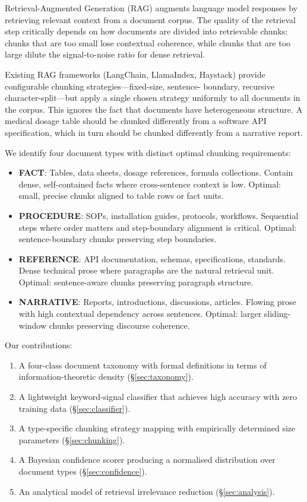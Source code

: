 \documentclass[conference]{IEEEtran}
\begin{document}
Retrieval-Augmented Generation (RAG)
\cite{lewis2020rag,karpukhin2020dpr} augments language model
responses by retrieving relevant context from a document
corpus. The quality of the retrieval step critically depends
on how documents are divided into retrievable chunks: chunks
that are too small lose contextual coherence, while chunks
that are too large dilute the signal-to-noise ratio for
dense retrieval.

Existing RAG frameworks (LangChain, LlamaIndex, Haystack)
provide configurable chunking strategies—fixed-size, sentence-
boundary, recursive character-split—but apply a single
chosen strategy uniformly to all documents in the corpus.
This ignores the fact that documents have heterogeneous
structure. A medical dosage table should be chunked
differently from a software API specification, which in
turn should be chunked differently from a narrative report.

We identify four document types with distinct optimal
chunking requirements:

\begin{itemize}
  \item \textbf{FACT}: Tables, data sheets, dosage
    references, formula collections. Contain dense,
    self-contained facts where cross-sentence context
    is low. Optimal: small, precise chunks aligned to
    table rows or fact units.
  \item \textbf{PROCEDURE}: SOPs, installation guides,
    protocols, workflows. Sequential steps where order
    matters and step-boundary alignment is critical.
    Optimal: sentence-boundary chunks preserving step
    boundaries.
  \item \textbf{REFERENCE}: API documentation, schemas,
    specifications, standards. Dense technical prose
    where paragraphs are the natural retrieval unit.
    Optimal: sentence-aware chunks preserving paragraph
    structure.
  \item \textbf{NARRATIVE}: Reports, introductions,
    discussions, articles. Flowing prose with high
    contextual dependency across sentences.
    Optimal: larger sliding-window chunks preserving
    discourse coherence.
\end{itemize}

Our contributions:
\begin{enumerate}
  \item A four-class document taxonomy with formal
    definitions in terms of information-theoretic
    density (\S\ref{sec:taxonomy}).
  \item A lightweight keyword-signal classifier that
    achieves high accuracy with zero training data
    (\S\ref{sec:classifier}).
  \item A type-specific chunking strategy mapping with
    empirically determined size parameters
    (\S\ref{sec:chunking}).
  \item A Bayesian confidence scorer producing a
    normalised distribution over document types
    (\S\ref{sec:confidence}).
  \item An analytical model of retrieval irrelevance
    reduction (\S\ref{sec:analysis}).
\end{enumerate}
\end{document}
